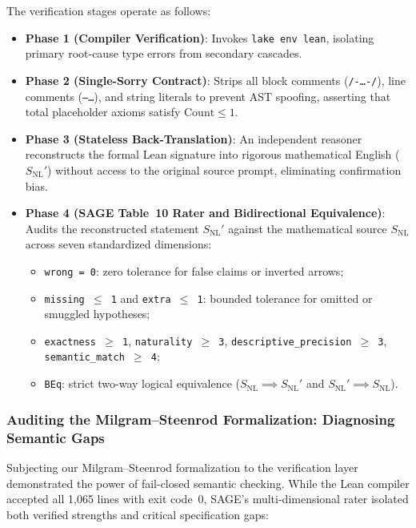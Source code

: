 \documentclass[12 pt]{article}
\theoremstyle{definition}
\begin{document}
The verification stages operate as follows:
\begin{itemize}
    \item \textbf{Phase 1 (Compiler Verification)}: Invokes \texttt{lake env lean}, isolating primary root-cause type errors from secondary cascades.
    \item \textbf{Phase 2 (Single-Sorry Contract)}: Strips all block comments (\texttt{/-\dots-/}), line comments (\texttt{--\dots}), and string literals to prevent AST spoofing, asserting that total placeholder axioms satisfy $\text{Count} \le 1$.
    \item \textbf{Phase 3 (Stateless Back-Translation)}: An independent reasoner reconstructs the formal Lean signature into rigorous mathematical English ($S_{\text{NL}}'$) without access to the original source prompt, eliminating confirmation bias.
    \item \textbf{Phase 4 (SAGE Table~10 Rater and Bidirectional Equivalence)}: Audits the reconstructed statement $S_{\text{NL}}'$ against the mathematical source $S_{\text{NL}}$ across seven standardized dimensions:
    \begin{itemize}
        \item \texttt{wrong = 0}: zero tolerance for false claims or inverted arrows;
        \item \texttt{missing $\le$ 1} and \texttt{extra $\le$ 1}: bounded tolerance for omitted or smuggled hypotheses;
        \item \texttt{exactness $\ge$ 1}, \texttt{naturality $\ge$ 3}, \texttt{descriptive\_precision $\ge$ 3}, \texttt{semantic\_match $\ge$ 4};
        \item \texttt{BEq}: strict two-way logical equivalence ($S_{\text{NL}} \implies S_{\text{NL}}'$ and $S_{\text{NL}}' \implies S_{\text{NL}}$).
    \end{itemize}
\end{itemize}

\subsubsection{Auditing the Milgram--Steenrod Formalization: Diagnosing Semantic Gaps}

Subjecting our Milgram--Steenrod formalization to the verification layer demonstrated the power of fail-closed semantic checking. While the Lean compiler accepted all 1,065 lines with exit code~0, SAGE's multi-dimensional rater isolated both verified strengths and critical specification gaps:
\end{document}
